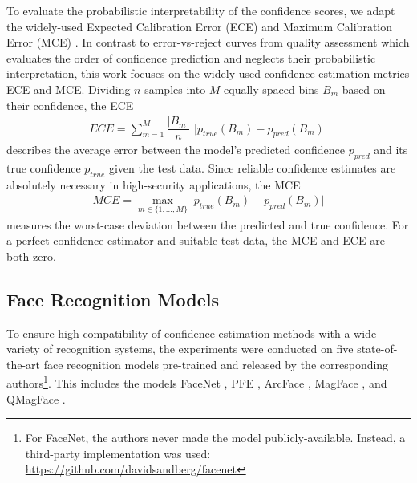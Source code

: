 \documentclass[10pt,twocolumn,letterpaper]{article}
\begin{document}
To evaluate the probabilistic interpretability of the confidence scores, we adapt the widely-used Expected Calibration Error (ECE) and Maximum Calibration Error (MCE) \cite{DBLP:conf/aaai/NaeiniCH15, DBLP:conf/icml/GuoPSW17}.
{In contrast to error-vs-reject curves from quality assessment} \cite{DBLP:conf/cvpr/TerhorstKDKK20} which evaluates the order of confidence prediction and neglects their probabilistic interpretation, this work focuses on the widely-used confidence estimation metrics ECE and MCE.
Dividing $n$ samples into $M$ equally-spaced bins $B_m$ based on their confidence, the ECE
\begin{align}
ECE = \sum_{m=1}^M \dfrac{|B_m|}{n} \,\, \lvert p_{true}(B_m) - p_{pred}(B_m)  \rvert
\end{align}
describes the average error between the model's predicted confidence $p_{pred}$ and its true confidence $p_{true}$ given the test data.
Since reliable confidence estimates are absolutely necessary in high-security applications, the MCE
\begin{align}
MCE = \max_{m\in\{1,...,M\}} \lvert p_{true}(B_m) - p_{pred}(B_m)  \rvert
\end{align}
measures the worst-case deviation between the predicted and true confidence.
For a perfect confidence estimator and suitable test data, the MCE and ECE are both zero. 


\subsection{Face Recognition Models}
To ensure high compatibility of confidence estimation methods with a wide variety of recognition systems, the experiments were conducted on five state-of-the-art face recognition models pre-trained and released by the corresponding authors\footnote{For FaceNet, the authors never made the model publicly-available. Instead, a third-party implementation was used: \url{https://github.com/davidsandberg/facenet}}.
This includes the models FaceNet \cite{DBLP:conf/cvpr/SchroffKP15}, PFE \cite{DBLP:conf/iccv/ShiJ19}, ArcFace \cite{DBLP:conf/cvpr/DengGXZ19}, MagFace \cite{DBLP:conf/cvpr/MengZH021}, and QMagFace \cite{DBLP:journals/corr/abs-2111-13475}.
\end{document}
